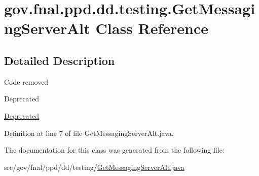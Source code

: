 \hypertarget{classgov_1_1fnal_1_1ppd_1_1dd_1_1testing_1_1GetMessagingServerAlt}{\section{gov.\-fnal.\-ppd.\-dd.\-testing.\-Get\-Messaging\-Server\-Alt Class Reference}
\label{classgov_1_1fnal_1_1ppd_1_1dd_1_1testing_1_1GetMessagingServerAlt}
}


\subsection{Detailed Description}
Code removed \begin{DoxyRefDesc}{Deprecated}
\item[\hyperlink{deprecated__deprecated000007}{Deprecated}]\end{DoxyRefDesc}


Definition at line 7 of file Get\-Messaging\-Server\-Alt.\-java.



The documentation for this class was generated from the following file\-:\begin{DoxyCompactItemize}
\item 
src/gov/fnal/ppd/dd/testing/\hyperlink{GetMessagingServerAlt_8java}{Get\-Messaging\-Server\-Alt.\-java}\end{DoxyCompactItemize}

